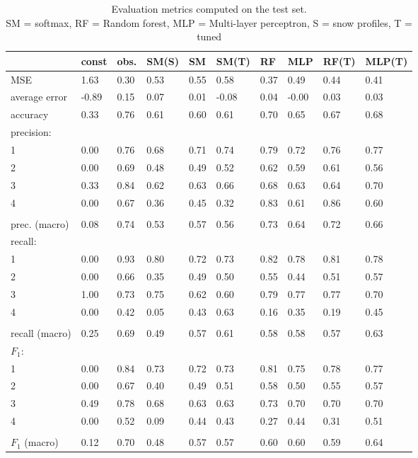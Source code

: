 \begin{table}[H]
\caption{Evaluation metrics computed on the test set. \\ SM = softmax, RF = Random forest, MLP = Multi-layer perceptron, S = snow profiles, T = tuned}
\label{tbl:sais_eval_test}
\begin{tabular}{llllllllll}
\toprule
 & const  & obs.   & SM(S) & SM     & SM(T) & RF     & MLP    & RF(T)  & MLP(T) \\
\midrule
MSE & 1.63 & 0.30 & 0.53 & 0.55 & 0.58 & 0.37 & 0.49 & 0.44 & 0.41 \\
average error & -0.89 & 0.15 & 0.07 & 0.01 & -0.08 & 0.04 & -0.00 & 0.03 & 0.03 \\
accuracy & 0.33 & 0.76 & 0.61 & 0.60 & 0.61 & 0.70 & 0.65 & 0.67 & 0.68 \\
precision: &  &  &  &  &  &  &  &  &  \\
1  & 0.00 & 0.76 & 0.68 & 0.71 & 0.74 & 0.79 & 0.72 & 0.76 & 0.77 \\
2   & 0.00 & 0.69 & 0.48 & 0.49 & 0.52 & 0.62 & 0.59 & 0.61 & 0.56 \\
3    & 0.33 & 0.84 & 0.62 & 0.63 & 0.66 & 0.68 & 0.63 & 0.64 & 0.70 \\
4     & 0.00 & 0.67 & 0.36 & 0.45 & 0.32 & 0.83 & 0.61 & 0.86 & 0.60 \\
     &  &  &  &  &  &  &  &  &  \\
prec. (macro) & 0.08 & 0.74 & 0.53 & 0.57 & 0.56 & 0.73 & 0.64 & 0.72 & 0.66 \\
recall: &  &  &  &  &  &  &  &  &  \\
1      & 0.00 & 0.93 & 0.80 & 0.72 & 0.73 & 0.82 & 0.78 & 0.81 & 0.78 \\
2       & 0.00 & 0.66 & 0.35 & 0.49 & 0.50 & 0.55 & 0.44 & 0.51 & 0.57 \\
3        & 1.00 & 0.73 & 0.75 & 0.62 & 0.60 & 0.79 & 0.77 & 0.77 & 0.70 \\
4         & 0.00 & 0.42 & 0.05 & 0.43 & 0.63 & 0.16 & 0.35 & 0.19 & 0.45 \\
         &  &  &  &  &  &  &  &  &  \\
recall (macro) & 0.25 & 0.69 & 0.49 & 0.57 & 0.61 & 0.58 & 0.58 & 0.57 & 0.63 \\
$F_1$: &  &  &  &  &  &  &  &  &  \\
1          & 0.00 & 0.84 & 0.73 & 0.72 & 0.73 & 0.81 & 0.75 & 0.78 & 0.77 \\
2           & 0.00 & 0.67 & 0.40 & 0.49 & 0.51 & 0.58 & 0.50 & 0.55 & 0.57 \\
3            & 0.49 & 0.78 & 0.68 & 0.63 & 0.63 & 0.73 & 0.70 & 0.70 & 0.70 \\
4             & 0.00 & 0.52 & 0.09 & 0.44 & 0.43 & 0.27 & 0.44 & 0.31 & 0.51 \\
             &  &  &  &  &  &  &  &  &  \\
$F_1$ (macro) & 0.12 & 0.70 & 0.48 & 0.57 & 0.57 & 0.60 & 0.60 & 0.59 & 0.64 \\
\bottomrule
\end{tabular}
\end{table}

